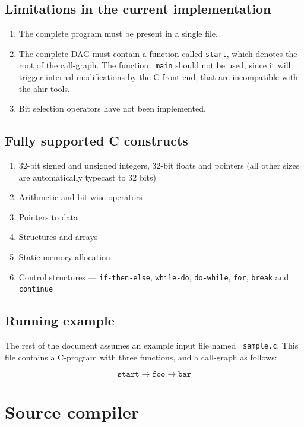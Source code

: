 \documentclass[12pt]{article}
\begin{document}
\subsection{Limitations in the current implementation}

\begin{enumerate}
  \item The complete program must be present in a single file.
  \item The complete DAG must contain a function called {\tt start},
        which denotes the root of the call-graph. The function {\tt
        main} should not be used, since it will trigger internal
        modifications by the C front-end, that are incompatible with
        the ahir tools.
  \item Bit selection operators have not been implemented.
\end{enumerate}

\subsection{Fully supported C constructs}

\begin{enumerate}
  \item 32-bit signed and unsigned integers, 32-bit floats and
        pointers (all other sizes are automatically typecast to 32
        bits)
  \item Arithmetic and bit-wise operators
  \item Pointers to data
  \item Structures and arrays
  \item Static memory allocation
  \item Control structures --- \texttt{if-then-else},
        \texttt{while-do}, \texttt{do-while}, \texttt{for},
        \texttt{break} and \texttt{continue}
\end{enumerate}

\subsection{Running example}

The rest of the document assumes an example input file named {\tt
sample.c}. This file contains a C-program with three functions, and a
call-graph as follows:

\[\texttt{start}\rightarrow\texttt{foo}\rightarrow\texttt{bar}\]

\section{Source compiler}
\end{document}
